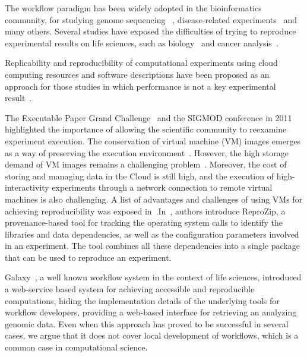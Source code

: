 The workflow paradigm has been widely adopted in the bioinformatics community, for studying genome sequencing ~\cite{blankenberg2010galaxy, giardine2005galaxy}, disease-related experiments~\cite{fisher2009systematic, gaizauskas2004} and many others. Several studies have exposed the difficulties of trying to reproduce experimental results on life sciences, such as biology~\cite{Ioannidis2009} and cancer analysis~\cite{ErringtonCancerRerpoducibility}.

Replicability and reproducibility of computational experiments using cloud computing resources and software descriptions have been proposed as an approach for those studies in which performance is not a key experimental result~\cite{Crick14}.

The Executable Paper Grand Challenge~\cite{elsevierchallenge} and the SIGMOD conference in 2011~\cite{SIGMOD} highlighted the importance of allowing the scientific community to reexamine experiment execution. The conservation of virtual machine (VM) images emerges as a way of preserving the execution environment~\cite{Brammer,SHARE}. However, the high storage demand of VM images remains a challenging problem~\cite{Mao:2014:ROD:2600090.2512348,6552826}. Moreover, the cost of storing and managing data in the Cloud is still high, and the execution of high-interactivity experiments through a network connection to remote virtual machines is also challenging. A list of advantages and challenges of using VMs for achieving reproducibility was exposed in~\cite{Howe2012}.In~\cite{reprozip}, authors introduce ReproZip, a provenance-based tool for tracking the operating system calls to identify the libraries and data dependencies, as well as the configuration parameters involved in an experiment. The tool combines all these dependencies into a single package that can be used to reproduce an experiment. %


Galaxy~\cite{goecks2010galaxy}, a well known workflow system in the context of life sciences, introduced a web-service based system for achieving accessible and reproducible computations, hiding the implementation details of the underlying tools for workflow developers, providing a web-based interface for retrieving an analyzing genomic data. Even when this approach has proved to be successful in several cases, we argue that it does not cover local development of workflows, which is a common case in computational science.  


